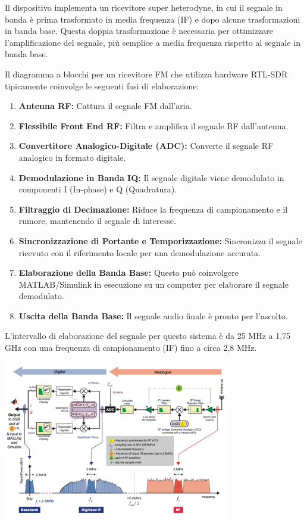 Il dispositivo implementa un ricevitore super heterodyne, in cui il segnale in banda è prima trasformato in media frequenza (IF) e dopo alcune trasformazioni in banda base.
Questa doppia trasformazione è necessaria per ottimizzare l'amplificazione del segnale, più semplice a media frequenza rispetto al segnale in banda base.

\begin{center}
    
\end{center}
Il diagramma a blocchi per un ricevitore FM che utilizza hardware RTL-SDR tipicamente coinvolge le seguenti fasi di elaborazione:
\begin{enumerate}
\item \textbf{Antenna RF:} Cattura il segnale FM dall'aria.
\item \textbf{Flessibile Front End RF:} Filtra e amplifica il segnale RF dall'antenna.
\item \textbf{Convertitore Analogico-Digitale (ADC):} Converte il segnale RF analogico in formato digitale.
\item \textbf{Demodulazione in Banda IQ:} Il segnale digitale viene demodulato in componenti I (In-phase) e Q (Quadratura).
\item \textbf{Filtraggio di Decimazione:} Riduce la frequenza di campionamento e il rumore, mantenendo il segnale di interesse.
\item \textbf{Sincronizzazione di Portante e Temporizzazione:} Sincronizza il segnale ricevuto con il riferimento locale per una demodulazione accurata.
\item \textbf{Elaborazione della Banda Base:} Questo può coinvolgere MATLAB/Simulink in esecuzione su un computer per elaborare il segnale demodulato.
\item \textbf{Uscita della Banda Base:} Il segnale audio finale è pronto per l'ascolto.
\end{enumerate}
L'intervallo di elaborazione del segnale per questo sistema è da 25 MHz a 1,75 GHz con una frequenza di campionamento (IF) fino a circa 2,8 MHz.\begin{center}
    \includegraphics[width=0.75\textwidth]{imgs/rtl-sdr.png}
\end{center}


